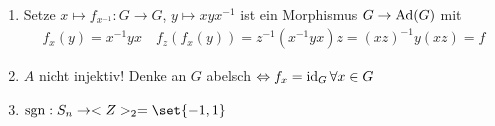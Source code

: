 \begin{example}
	\begin{enumerate}
		\item Setze $x \mapsto f_{x^{-1}}: G \to G$, $y \mapsto xyx^{-1}$ ist ein Morphismus $G \to \operatorname{Ad}(G)$ mit
		\begin{align*}
		f_x(y) = x^{-1}yx \quad f_z(f_x(y)) = z^{-1}(x^{-1}yx)z = (xz)^{-1}y(xz) = f
		\end{align*}
		\item $A$ nicht injektiv! Denke an $G$ abelsch $\Leftrightarrow f_x = \operatorname{id}_G \forall x \in G$
		\item $\sgn: S_n \to \Z_2 = \set{-1,1}$
	\end{enumerate}
\end{example}